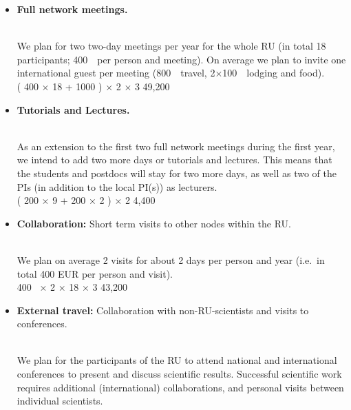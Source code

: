 \documentclass[10pt,fleqn,twoside]{article}
\begin{document}
\begin{itemize}
\item
\begin{Emphasize}
{\bf Full network meetings.}
\end{Emphasize}\\
We plan for two two-day meetings per year for the whole RU (in total 18
participants; 400~\EUR{}\ per person and meeting). On average we plan to 
invite one international guest per meeting (800~\EUR{}\ travel, 2$\times$100~\EUR{}\ 
lodging and food).\vspace{0.2em}\\
( 400 \EUR{} $\times$ 18 +  1000 \EUR{} ) $\times$ 2 $\times$ 3  \hfill 49,200~\EUR{}\\
\item
\begin{Emphasize}
{\bf Tutorials and Lectures.}
\end{Emphasize}\\
As an extension to the first two full network meetings during the first year, we
intend to add two more days or tutorials and lectures. This means that the
students and postdocs will stay for two more days, as well as two of the PIs
(in addition to the local PI(s)) as lecturers.
\vspace{0.2em}\\
( 200 \EUR{} $\times$ 9 + 200 \EUR{} $\times$ 2 ) $\times$ 2  \hfill 4,400~\EUR{}\\
\item 
\begin{Emphasize}
{\bf Collaboration:} Short term visits to other nodes within the RU.
\end{Emphasize}\\
We plan on average 2 visits for about 2 days per person and year
(i.e.\ in total 400 EUR per person and visit).
\vspace{0.2em}\\
400~\EUR{} $\times$ 2 $\times$ 18 $\times$ 3    \hfill 43,200~\EUR{}\\
\item 
\begin{Emphasize}
{\bf External travel:} Collaboration with non-RU-scientists and visits to conferences.
\end{Emphasize}\\
We plan for the participants of the RU to attend national and
international conferences to present and discuss scientific results.
Successful scientific work requires additional (international) collaborations, and
personal visits between individual scientists.

\end{itemize}
\end{document}
